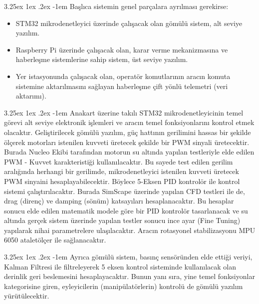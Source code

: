 \documentclass[12pt]{article}
\makeatletter
\newcounter{subsubsubsection}[subsubsection]
\renewcommand\paragraph{\@startsection{paragraph}{5}{\z@}%
  {3.25ex \@plus1ex \@minus.2ex}%
  {-1em}%
  {\normalfont\normalsize\bfseries}}
\makeatother
\begin{document}
\paragraph{} Başlıca sistemin genel parçalara ayrılması gerekirse:
\begin{itemize}
    \item STM32 mikrodenetleyici üzerinde çalışacak olan gömülü sistem, alt seviye yazılım.
    \item Raspberry Pi üzerinde çalışacak olan, karar verme mekanizmasına ve haberleşme sistemlerine sahip sistem, üst seviye yazılım.
    \item Yer istasyonunda çalışacak olan, operatör komutlarının aracın komuta sistemine aktarılmasını sağlayan haberleşme çift yönlü telemetri (veri aktarımı).
\end{itemize}


 \paragraph{}  Anakart üzerine takılı STM32 mikrodenetleyicinin temel görevi alt seviye elektronik işlemleri ve aracın temel fonksiyonlarını kontrol etmek olacaktır. Geliştirilecek gömülü yazılım, güç hattının gerilimini hassas bir şekilde ölçerek motorları istenilen kuvveti üretecek şekilde bir PWM sinyali üretecektir. Burada Nucleo Ekibi tarafından motorun su altında yapılan testleriyle elde edilen PWM - Kuvvet karakteristiği kullanılacaktır. Bu sayede test edilen gerilim aralığında herhangi bir gerilimde, mikrodenetleyici istenilen kuvveti üretecek PWM sinyaini hesaplayabilecektir. Böylece 5-Eksen PID kontrolör ile kontrol sistemi çalıştırılacaktır. Burada SimScape üzerinde yapılan CFD testleri ile de, drag (direnç) ve damping (sönüm) katsayıları hesaplanacaktır. Bu hesaplar sonucu elde edilen matematik modele göre bir PID kontrolör tasarlanacak ve su altında gerçek sistem üzerinde yapılan testler sonucu ince ayar (Fine Tuning) yapılarak nihai parametrelere ulaşılacaktır. Aracın rotasyonel stabilizasyonu MPU 6050 ataletölçer ile sağlanacaktır.

\paragraph{} Ayrıca gömülü sistem, basınç sensöründen elde ettiği veriyi, Kalman Filtresi ile filtreleyerek 5 eksen kontrol sisteminde kullanılacak olan derinlik geri beslemesini hesaplayacaktır. Bunun yanı sıra, yine temel fonksiyonlar kategorisine giren, eyleyicilerin (manipülatörlerin) kontrolü de gömülü yazılım yürütülecektir.
\end{document}
